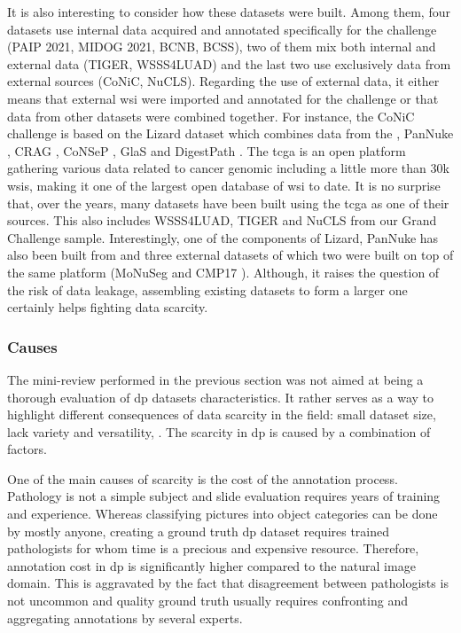 It is also interesting to consider how these datasets were built. Among them, four datasets use internal data acquired and annotated specifically for the challenge (PAIP 2021, MIDOG 2021, BCNB, BCSS), two of them mix both internal and external data (TIGER, WSSS4LUAD) and the last two use exclusively data from external sources (CoNiC, NuCLS). Regarding the use of external data, it either means that external \acrshort{wsi} were imported and annotated for the challenge or that data from other datasets were combined together. For instance, the CoNiC challenge is based on the Lizard dataset \parencite{graham2021lizard} which combines data from the  \parencite{weinstein2013cancer}, PanNuke \parencite{gamper2019pannuke}, CRAG \parencite{graham2019mild}, CoNSeP \parencite{graham2019hover}, GlaS \parencite{sirinukunwattana2017gland} and DigestPath \parencite{li2019signet}. The \acrshort{tcga} is an open platform gathering various data related to cancer genomic including a little more than 30k \acrlong{wsi}s, making it one of the largest open database of \acrshort{wsi} to date. It is no surprise that, over the years, many datasets have been built using the \acrshort{tcga} as one of their sources. This also includes WSSS4LUAD, TIGER and NuCLS from our Grand Challenge sample. Interestingly, one of the components of Lizard, PanNuke has also been built from  and three external datasets of which two were built on top of the same platform (MoNuSeg \parencite{kumar2019multi} and CMP17 \parencite{vu2019methods}). Although, it raises the question of the risk of data leakage, assembling existing datasets to form a larger one certainly helps fighting data scarcity.

\subsubsection{Causes}
\label{sssec:backdp:ds-causes}

The mini-review performed in the previous section was not aimed at being a thorough evaluation of \acrshort{dp} datasets characteristics. It rather serves as a way to highlight different consequences of data scarcity in the field: small dataset size, lack variety and versatility, \etc. The scarcity in \acrlong{dp} is caused by a combination of factors.  

One of the main causes of scarcity is the cost of the annotation process. Pathology is not a simple subject and slide evaluation requires years of training and experience. Whereas classifying pictures into object categories can be done by mostly anyone, creating a ground truth \acrlong{dp} dataset requires trained pathologists for whom time is a precious and expensive resource. Therefore, annotation cost in \acrlong{dp} is significantly higher compared to the natural image domain. This is aggravated by the fact that disagreement between pathologists is not uncommon and quality ground truth usually requires confronting and aggregating annotations by several experts. 


